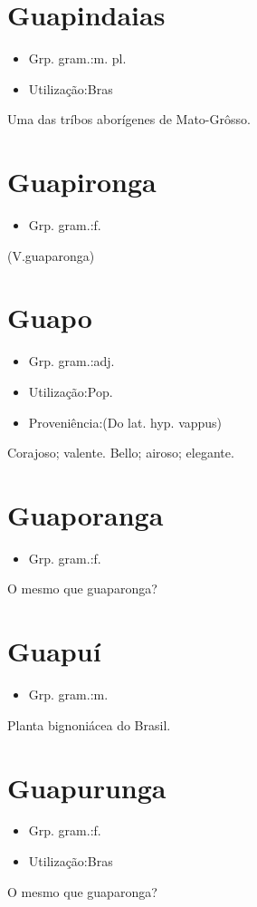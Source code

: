 \section{Guapindaias}
\begin{itemize}
\item {Grp. gram.:m. pl.}
\end{itemize}
\begin{itemize}
\item {Utilização:Bras}
\end{itemize}
Uma das tríbos aborígenes de Mato-Grôsso.
\section{Guapironga}
\begin{itemize}
\item {Grp. gram.:f.}
\end{itemize}
(V.guaparonga)
\section{Guapo}
\begin{itemize}
\item {Grp. gram.:adj.}
\end{itemize}
\begin{itemize}
\item {Utilização:Pop.}
\end{itemize}
\begin{itemize}
\item {Proveniência:(Do lat. hyp. \textunderscore vappus\textunderscore )}
\end{itemize}
Corajoso; valente.
Bello; airoso; elegante.
\section{Guaporanga}
\begin{itemize}
\item {Grp. gram.:f.}
\end{itemize}
O mesmo que \textunderscore guaparonga\textunderscore ?
\section{Guapuí}
\begin{itemize}
\item {Grp. gram.:m.}
\end{itemize}
Planta bignoniácea do Brasil.
\section{Guapurunga}
\begin{itemize}
\item {Grp. gram.:f.}
\end{itemize}
\begin{itemize}
\item {Utilização:Bras}
\end{itemize}
O mesmo que \textunderscore guaparonga\textunderscore ?
